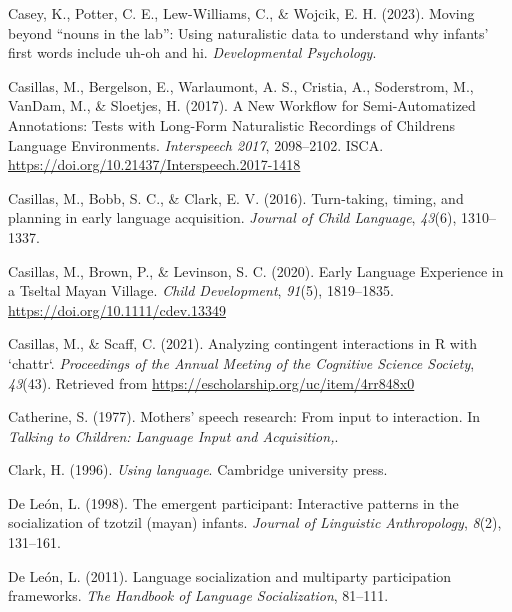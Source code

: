 \documentclass[
  man]{apa6}
\newlength{\cslhangindent}
\newlength{\cslentryspacingunit} %
\newenvironment{CSLReferences}[2] %
 {%
  \setlength{\parindent}{0pt}
  \ifodd #1
  \let\oldpar\par
  \def\par{\hangindent=\cslhangindent\oldpar}
  \fi
  \setlength{\parskip}{#2\cslentryspacingunit}
 }%
 {}
\begin{document}
\begin{CSLReferences}{1}{0}
\leavevmode{}%
Casey, K., Potter, C. E., Lew-Williams, C., \& Wojcik, E. H. (2023). Moving beyond {``nouns in the lab''}: Using naturalistic data to understand why infants' first words include uh-oh and hi. \emph{Developmental Psychology}.

\leavevmode{}%
Casillas, M., Bergelson, E., Warlaumont, A. S., Cristia, A., Soderstrom, M., VanDam, M., \& Sloetjes, H. (2017). A {New} {Workflow} for {Semi}-{Automatized} {Annotations}: {Tests} with {Long}-{Form} {Naturalistic} {Recordings} of {Childrens} {Language} {Environments}. \emph{Interspeech 2017}, 2098--2102. ISCA. \url{https://doi.org/10.21437/Interspeech.2017-1418}

\leavevmode{}%
Casillas, M., Bobb, S. C., \& Clark, E. V. (2016). Turn-taking, timing, and planning in early language acquisition. \emph{Journal of Child Language}, \emph{43}(6), 1310--1337.

\leavevmode{}%
Casillas, M., Brown, P., \& Levinson, S. C. (2020). Early {Language} {Experience} in a {Tseltal} {Mayan} {Village}. \emph{Child Development}, \emph{91}(5), 1819--1835. \url{https://doi.org/10.1111/cdev.13349}

\leavevmode{}%
Casillas, M., \& Scaff, C. (2021). Analyzing contingent interactions in {R} with `chattr`. \emph{Proceedings of the Annual Meeting of the Cognitive Science Society}, \emph{43}(43). Retrieved from \url{https://escholarship.org/uc/item/4rr848x0}

\leavevmode{}%
Catherine, S. (1977). Mothers' speech research: {From} input to interaction. In \emph{Talking to {Children}: {Language} {Input} and {Acquisition},}.

\leavevmode{}%
Clark, H. (1996). \emph{Using language}. Cambridge university press.

\leavevmode{}%
De León, L. (1998). The emergent participant: Interactive patterns in the socialization of tzotzil (mayan) infants. \emph{Journal of Linguistic Anthropology}, \emph{8}(2), 131--161.

\leavevmode{}%
De León, L. (2011). Language socialization and multiparty participation frameworks. \emph{The Handbook of Language Socialization}, 81--111.


\end{CSLReferences}
\end{document}

